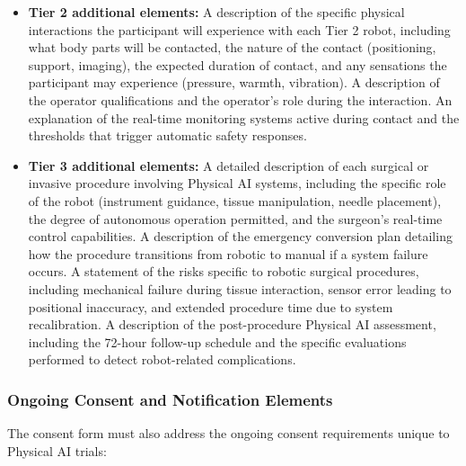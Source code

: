 \begin{itemize}
    \item \textbf{Tier 2 additional elements:} A description of the specific
    physical interactions the participant will experience with each Tier 2
    robot, including what body parts will be contacted, the nature of the
    contact (positioning, support, imaging), the expected duration of contact,
    and any sensations the participant may experience (pressure, warmth,
    vibration). A description of the operator qualifications and the
    operator's role during the interaction. An explanation of the real-time
    monitoring systems active during contact and the thresholds that trigger
    automatic safety responses.

    \item \textbf{Tier 3 additional elements:} A detailed description of
    each surgical or invasive procedure involving Physical AI systems,
    including the specific role of the robot (instrument guidance, tissue
    manipulation, needle placement), the degree of autonomous operation
    permitted, and the surgeon's real-time control capabilities. A
    description of the emergency conversion plan detailing how the procedure
    transitions from robotic to manual if a system failure occurs. A
    statement of the risks specific to robotic surgical procedures, including
    mechanical failure during tissue interaction, sensor error leading to
    positional inaccuracy, and extended procedure time due to system
    recalibration. A description of the post-procedure Physical AI
    assessment, including the 72-hour follow-up schedule and the specific
    evaluations performed to detect robot-related complications.
\end{itemize}

\subsubsection{Ongoing Consent and Notification Elements}

The consent form must also address the ongoing consent requirements unique to
Physical AI trials:

